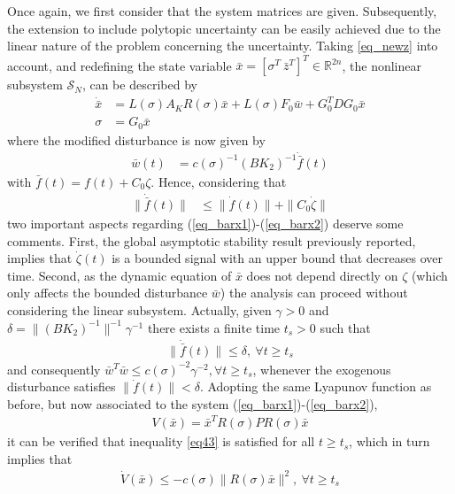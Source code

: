\documentclass[twocolumn]{autarc_LH}
\newcommand{\Rf}{{\mathbb R}}
\begin{document}
Once again, we first consider that the system matrices are given. Subsequently, the extension to include polytopic uncertainty can be easily achieved due to the linear nature of the problem concerning the uncertainty. 
Taking \eqref{eq_newz} into account, and redefining the state variable  $\bar x =[\sigma^T~\bar z^T]^T \in \Rf^{2n}$, the nonlinear subsystem $\mathcal{S}_{N}$, can be described by
\begin{align}
    \label{eq_barx1}  \dot{\bar{x}} & =  L(\sigma) A_K R(\sigma) \bar x + L(\sigma) F_0 \bar w + G_0^T D G_0 \bar x  \\
\label{eq_barx2}  \sigma & = G_0 \bar x
\end{align}
where the modified disturbance is now given by
\begin{align}
    \label{eq_barx3}
\bar w(t) & = c(\sigma)^{-1} (BK_2)^{-1}  \dot{\bar{f}}(t) 
\end{align}
with $ \bar f(t) = f(t) + C_{0} \zeta$. Hence, considering that 
\begin{align} \label{eq_barx4}
\| \dot{\bar{f}}(t) \| & \leq  \| \dot{f}(t) \| + \|C_{0} \dot \zeta\| 
\end{align}
two important aspects regarding (\ref{eq_barx1})-(\ref{eq_barx2}) deserve some comments. First, the global asymptotic stability result previously reported, implies that $\dot{\zeta}(t)$ is a bounded signal with an upper bound that decreases over time. Second, as the dynamic equation of $\bar x$ does not depend directly on $\zeta$ (which only affects the bounded disturbance $\bar w$) the analysis can proceed without considering the linear subsystem. Actually, given $\gamma>0$ and $\delta = \|(BK_2)^{-1}\|^{-1} \gamma^{-1}$ there exists a finite time $t_s>0$ such that
\begin{align}
    \label{eq_dot_barf_bound}
    \| \dot{\bar{f}}(t) \| \leq \delta,~\forall t \geq t_s
\end{align}
and consequently $\bar w^T \bar w \leq  c(\sigma)^{-2} \gamma^{-2}, \forall t \geq t_s$, whenever the exogenous disturbance satisfies $\|\dot f(t) \| < \delta$. Adopting the same Lyapunov function as before, but now associated to the system (\ref{eq_barx1})-(\ref{eq_barx2}),   
\begin{align}
\label{eq_barV}  V( \bar x) = \bar x^TR(\sigma) P R(\sigma) \bar x
\end{align}
it can be verified that inequality \eqref{eq43} is satisfied for all $t \geq t_s$, which in turn implies that
\begin{align} \label{eq_dbarV}
\dot V( \bar x) \leq - c(\sigma) \| R(\sigma) \bar x \|^2,~\forall t \geq t_s
\end{align}
\end{document}
